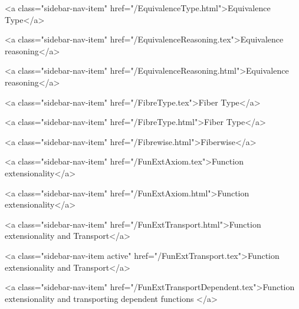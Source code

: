       
    
      
        
          <a class="sidebar-nav-item" href="/EquivalenceType.html">Equivalence Type</a>
        
      
    
      
        
          <a class="sidebar-nav-item" href="/EquivalenceReasoning.tex">Equivalence reasoning</a>
        
      
    
      
        
          <a class="sidebar-nav-item" href="/EquivalenceReasoning.html">Equivalence reasoning</a>
        
      
    
      
        
          <a class="sidebar-nav-item" href="/FibreType.tex">Fiber Type</a>
        
      
    
      
        
          <a class="sidebar-nav-item" href="/FibreType.html">Fiber Type</a>
        
      
    
      
        
          <a class="sidebar-nav-item" href="/Fibrewise.html">Fiberwise</a>
        
      
    
      
        
          <a class="sidebar-nav-item" href="/FunExtAxiom.tex">Function extensionality</a>
        
      
    
      
        
          <a class="sidebar-nav-item" href="/FunExtAxiom.html">Function extensionality</a>
        
      
    
      
        
          <a class="sidebar-nav-item" href="/FunExtTransport.html">Function extensionality and Transport</a>
        
      
    
      
        
          <a class="sidebar-nav-item active" href="/FunExtTransport.tex">Function extensionality and Transport</a>
        
      
    
      
        
          <a class="sidebar-nav-item" href="/FunExtTransportDependent.tex">Function extensionality and transporting dependent functions </a>
        
